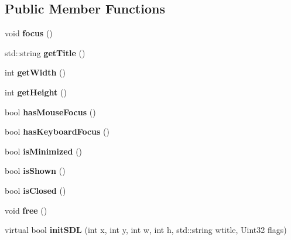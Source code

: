 \subsection*{Public Member Functions}
\begin{DoxyCompactItemize}
\item 
\mbox{\label{classIWindow_a581d0a0e80fa1b306c75baf97f980058}} 
void {\bfseries focus} ()
\item 
\mbox{\label{classIWindow_a547e4dd8501495adccdada6debda72a3}} 
std\+::string {\bfseries get\+Title} ()
\item 
\mbox{\label{classIWindow_aaa18b6919c4d137b5c6e643b48d7313e}} 
int {\bfseries get\+Width} ()
\item 
\mbox{\label{classIWindow_a251ce5df947a707de976cff69676a5ae}} 
int {\bfseries get\+Height} ()
\item 
\mbox{\label{classIWindow_a889fa8cebb6fcce7275d10ef07b480d5}} 
bool {\bfseries has\+Mouse\+Focus} ()
\item 
\mbox{\label{classIWindow_a3695d067badd925b338a7b5948b59e79}} 
bool {\bfseries has\+Keyboard\+Focus} ()
\item 
\mbox{\label{classIWindow_a5910147fb0b414064f64f2231f92d1de}} 
bool {\bfseries is\+Minimized} ()
\item 
\mbox{\label{classIWindow_ae2b66e061e2f061cc666078792824744}} 
bool {\bfseries is\+Shown} ()
\item 
\mbox{\label{classIWindow_adadfda7f9c456e5c424e45b35c212709}} 
bool {\bfseries is\+Closed} ()
\item 
\mbox{\label{classIWindow_a73804a0ba1197ac35b6cbf6e42e2cb73}} 
void {\bfseries free} ()
\item 
\mbox{\label{classIWindow_a717bcbad01a77ea320c9c83052926668}} 
virtual bool {\bfseries init\+S\+DL} (int x, int y, int w, int h, std\+::string wtitle, Uint32 flags)
\item 

\end{DoxyCompactItemize}
